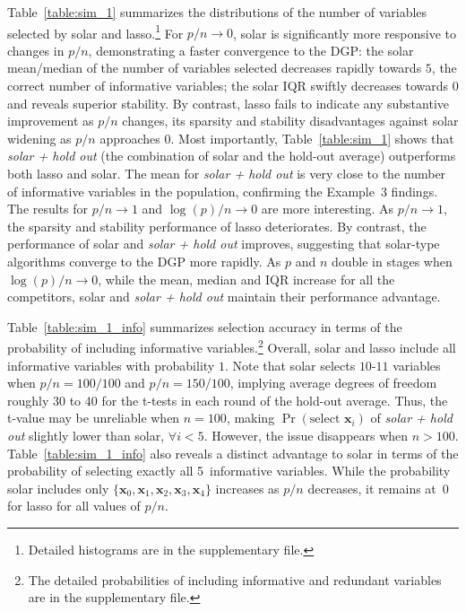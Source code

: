 \documentclass[12pt]{article}
\begin{document}
Table~\ref{table:sim_1} summarizes the distributions of the number of variables selected by solar and lasso.\footnote{Detailed histograms are in the supplementary file.} For $p/n \rightarrow 0$, solar is significantly more responsive to changes in $p/n$, demonstrating a faster convergence to the DGP: the solar mean/median of the number of variables selected decreases rapidly towards $5$, the correct number of informative variables; the solar IQR swiftly decreases towards $0$ and reveals superior stability. By contrast, lasso fails to indicate any substantive improvement as $p/n$ changes, its sparsity and stability disadvantages against solar widening as $p/n$ approaches 0. Most importantly, Table~\ref{table:sim_1} shows that \emph{solar + hold out} (the combination of solar and the hold-out average) outperforms both lasso and solar. The mean for \emph{solar + hold out} is very close to the number of informative variables in the population, confirming the Example~3 findings. The results for $p/n\rightarrow1$ and $\log(p)/n\rightarrow0$ are more interesting. As $p/n\rightarrow1$, the sparsity and stability performance of lasso deteriorates. By contrast, the performance of solar and \emph{solar + hold out} improves, suggesting that solar-type algorithms converge to the DGP more rapidly. As $p$ and $n$ double in stages when $\log(p)/n\rightarrow0$, while the mean, median and IQR increase for all the competitors, solar and \emph{solar + hold out} maintain their performance advantage.

Table~\ref{table:sim_1_info} summarizes selection accuracy in terms of the probability of including informative variables.\footnote{The detailed probabilities of including informative and redundant variables are in the supplementary file.} Overall, solar and lasso include all informative variables with probability $1$. Note that solar selects $10$-$11$ variables when $p/n=100/100$ and $p/n=150/100$, implying average degrees of freedom roughly $30$ to $40$ for the t-tests in each round of the hold-out average. Thus, the t-value may be unreliable when $n=100$, making $\Pr(\mbox{select }\mathbf{x}_i)$ of \emph{solar + hold out} slightly lower than solar, $\forall i <5$. However, the issue disappears when $n>100$. Table~\ref{table:sim_1_info} also reveals a distinct advantage to solar in terms of the probability of selecting exactly all 5~informative variables. While the probability solar includes only $\{\mathbf{x}_0,\mathbf{x}_1,\mathbf{x}_2,\mathbf{x}_3,\mathbf{x}_4\}$ increases as $p/n$ decreases, it remains at~0 for lasso for all values of $p/n$.
\end{document}
